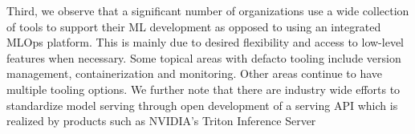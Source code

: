 Third, we observe that a significant number of organizations use a wide collection of tools to support their ML development as opposed to using an integrated MLOps platform. This is mainly due to desired flexibility and access to low-level features when necessary. Some topical areas with defacto tooling include version management, containerization and monitoring. Other areas continue to have multiple tooling options. We further note that there are industry wide efforts to standardize model serving through open development of a serving API which is realized by products such as NVIDIA's Triton Inference Server\DIFdelbegin {}\DIFdelend \DIFaddbegin {}\DIFaddend 




